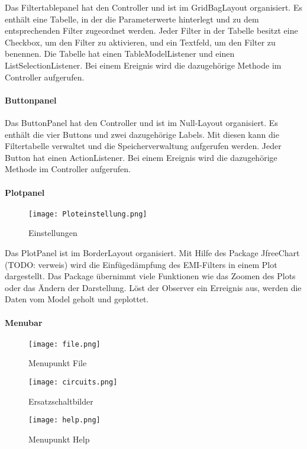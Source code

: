Das Filtertablepanel hat den Controller und ist im GridBagLayout organisiert. Es enthält eine Tabelle, in der die Parameterwerte hinterlegt und zu dem entsprechenden Filter zugeordnet werden. Jeder Filter in der Tabelle besitzt eine Checkbox, um den Filter zu aktivieren, und ein Textfeld, um den Filter  zu benennen. Die Tabelle hat einen TableModelListener und einen ListSelectionListener. Bei einem Ereignis wird die dazugehörige Methode im Controller  aufgerufen.
\bigskip

\newpage

\paragraph{Buttonpanel} \label{par:buttonpanel}
Das ButtonPanel hat den Controller und ist im Null-Layout organisiert. Es enthält die vier Buttons und zwei dazugehörige Labels. Mit diesen kann die Filtertabelle verwaltet und die Speicherverwaltung aufgerufen werden. Jeder Button hat einen ActionListener. Bei einem Ereignis wird die dazugehörige Methode im Controller  aufgerufen.
\bigskip

\paragraph{Plotpanel} \label{par:plotpanel}

\begin{figure}[H]
	\centering
	\texttt{[image: Ploteinstellung.png]}
	\caption{Einstellungen}
	\label{fig:einstellung}
\end{figure} 

Das PlotPanel ist im BorderLayout organisiert. Mit Hilfe des Package JfreeChart (TODO: verweis) wird die Einfügedämpfung des EMI-Filters in einem Plot dargestellt. Das Package übernimmt viele Funktionen wie das Zoomen des Plots oder das Ändern der Darstellung. Löst der Observer ein Erreignis aus, werden die Daten vom Model geholt und geplottet.

\bigskip
\newpage

\paragraph{Menubar} \label{par:menu}

\begin{figure}[H]
	\centering
	\begin{minipage}{0.3\linewidth}
		\centering
		\texttt{[image: file.png]}
		\caption{Menupunkt File}
		\label{fig:file}
	\end{minipage}
    	\begin{minipage}{0.3\linewidth}
	\centering
		\texttt{[image: circuits.png]}
		\caption{Ersatzschaltbilder}
		\label{fig:circuits}
	\end{minipage}
        \begin{minipage}{0.3\linewidth}
    \centering
		\texttt{[image: help.png]}
		\caption{Menupunkt Help}
		\label{fig:help}
    \end{minipage}  
\end{figure}


